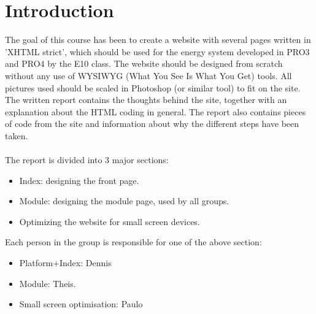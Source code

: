 \chapter{Introduction}
The goal of this course has been to create a website with several pages written in 'XHTML strict', which should be used for the energy system developed in PRO3 and PRO4 by the E10 class. The website should be designed from scratch without any use of WYSIWYG (What You See Is What You Get) tools. All pictures used should be scaled in Photoshop (or similar tool) to fit on the site. \\The written report contains the thoughts behind the site, together with an explanation about the HTML coding in general. The report also contains pieces of code from the site and information about why the different steps have been taken. \\
\\
The report is divided into 3 major sections:
\begin{itemize}
	\item Index: designing the front page.
	\item Module: designing the module page, used by all groups.
	\item Optimizing the website for small screen devices.
\end{itemize}
Each person in the group is responsible for one of the above section:
\begin{itemize}
	\item Platform+Index: Dennis
	\item Module: Theis.
	\item Small screen optimisation: Paulo
\end{itemize}
